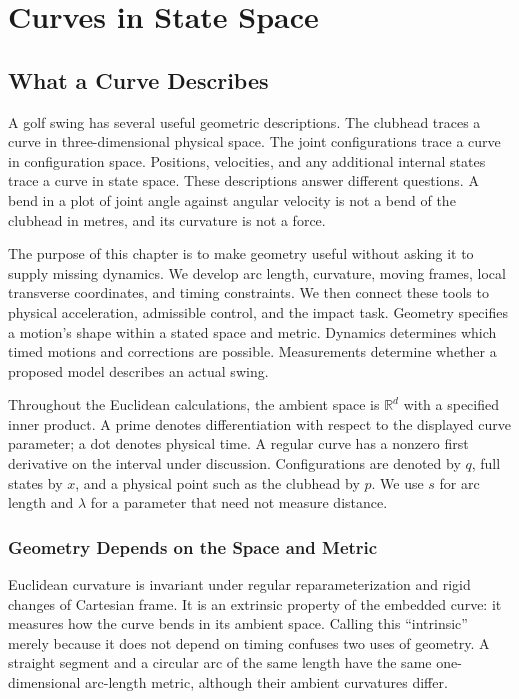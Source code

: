 \chapter{Curves in State Space}
\label{ch:curves_in_state_space}

\section{What a Curve Describes}

A golf swing has several useful geometric descriptions. The clubhead traces a
curve in three-dimensional physical space. The joint configurations trace a
curve in configuration space. Positions, velocities, and any additional
internal states trace a curve in state space. These descriptions answer
different questions. A bend in a plot of joint angle against angular velocity
is not a bend of the clubhead in metres, and its curvature is not a force.

The purpose of this chapter is to make geometry useful without asking it to
supply missing dynamics. We develop arc length, curvature, moving frames,
local transverse coordinates, and timing constraints. We then connect these
tools to physical acceleration, admissible control, and the impact task.
Geometry specifies a motion's shape within a stated space and metric.
Dynamics determines which timed motions and corrections are possible.
Measurements determine whether a proposed model describes an actual swing.

Throughout the Euclidean calculations, the ambient space is $\mathbb R^d$
with a specified inner product. A prime denotes differentiation with respect
to the displayed curve parameter; a dot denotes physical time. A regular
curve has a nonzero first derivative on the interval under discussion.
Configurations are denoted by $q$, full states by $x$, and a physical point
such as the clubhead by $p$. We use $s$ for arc length and $\lambda$ for a
parameter that need not measure distance.

\subsection{Geometry Depends on the Space and Metric}

Euclidean curvature is invariant under regular reparameterization and rigid
changes of Cartesian frame. It is an extrinsic property of the embedded
curve: it measures how the curve bends in its ambient space. Calling this
``intrinsic'' merely because it does not depend on timing confuses two uses
of geometry. A straight segment and a circular arc of the same length have
the same one-dimensional arc-length metric, although their ambient
curvatures differ.

